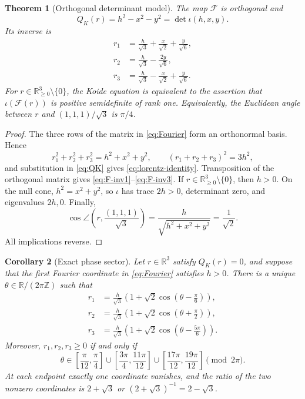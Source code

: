 \documentclass[11pt]{article}
\numberwithin{equation}{section}
\newtheorem{theorem}{Theorem}[section]
\newtheorem{corollary}[theorem]{Corollary}
\theoremstyle{definition}
\theoremstyle{remark}
\newcommand{\R}{\mathbb R}
\newcommand{\Z}{\mathbb Z}
\begin{document}
\begin{theorem}[Orthogonal determinant model]\label{thm:orthogonal-model}
The map $\mathcal F$ is orthogonal and
\begin{equation}\label{eq:lorentz-identity}
 Q_K(r)=h^2-x^2-y^2=\det\iota(h,x,y).
\end{equation}
Its inverse is
\begin{align}
 r_1&=\frac h{\sqrt3}+\frac x{\sqrt2}+\frac y{\sqrt6},\label{eq:F-inv1}\\
 r_2&=\frac h{\sqrt3}-\frac{2y}{\sqrt6},\label{eq:F-inv2}\\
 r_3&=\frac h{\sqrt3}-\frac x{\sqrt2}+\frac y{\sqrt6}.\label{eq:F-inv3}
\end{align}
For $r\in\R_{\geq0}^3\setminus\{0\}$, the Koide equation is equivalent to the assertion that $\iota(\mathcal F(r))$ is positive semidefinite of rank one.  Equivalently, the Euclidean angle between $r$ and $(1,1,1)/\sqrt3$ is $\pi/4$.
\end{theorem}

\begin{proof}
The three rows of the matrix in \eqref{eq:Fourier} form an orthonormal basis.  Hence
\[
 r_1^2+r_2^2+r_3^2=h^2+x^2+y^2,
 \qquad (r_1+r_2+r_3)^2=3h^2,
\]
and substitution in \eqref{eq:QK} gives \eqref{eq:lorentz-identity}.  Transposition of the orthogonal matrix gives \eqref{eq:F-inv1}--\eqref{eq:F-inv3}.  If $r\in\R_{\geq0}^3\setminus\{0\}$, then $h>0$.  On the null cone, $h^2=x^2+y^2$, so $\iota$ has trace $2h>0$, determinant zero, and eigenvalues $2h,0$.  Finally,
\[
 \cos\angle\left(r,\frac{(1,1,1)}{\sqrt3}\right)
 =\frac{h}{\sqrt{h^2+x^2+y^2}}=\frac1{\sqrt2}.
\]
All implications reverse.
\end{proof}

\begin{corollary}[Exact phase sector]
\label{cor:exact-phase-sector}
Let $r\in\R^3$ satisfy $Q_K(r)=0$, and suppose that the first Fourier
coordinate in \eqref{eq:Fourier} satisfies $h>0$.  There is a unique
$\theta\in\R/(2\pi\Z)$ such that
\begin{align}
 r_1&=\frac h{\sqrt3}
 \left(1+\sqrt2\cos\left(\theta-\frac\pi6\right)\right),
 \label{eq:phase-r1}\\
 r_2&=\frac h{\sqrt3}
 \left(1+\sqrt2\cos\left(\theta+\frac\pi2\right)\right),
 \label{eq:phase-r2}\\
 r_3&=\frac h{\sqrt3}
 \left(1+\sqrt2\cos\left(\theta-\frac{5\pi}6\right)\right).
 \label{eq:phase-r3}
\end{align}
Moreover, $r_1,r_2,r_3\geq0$ if and only if
\begin{equation}
 \theta\in
 \left[\frac\pi{12},\frac\pi4\right]
 \cup\left[\frac{3\pi}4,\frac{11\pi}{12}\right]
 \cup\left[\frac{17\pi}{12},\frac{19\pi}{12}\right]
 \pmod {2\pi}.
 \label{eq:nonnegative-phase-arcs}
\end{equation}
At each endpoint exactly one coordinate vanishes, and the ratio of the two
nonzero coordinates is $2+\sqrt3$ or $(2+\sqrt3)^{-1}=2-\sqrt3$.
\end{corollary}
\end{document}
